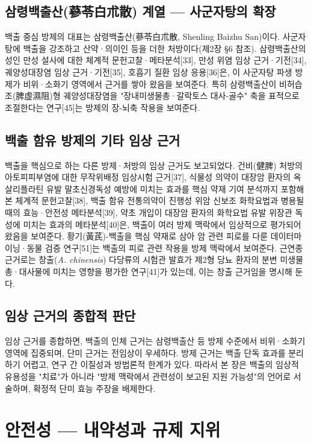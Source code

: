 \documentclass[12pt,oneside]{book}
\begin{document}
\subsection{삼령백출산(蔘苓白朮散) 계열 — 사군자탕의 확장}

백출 중심 방제의 대표는 삼령백출산(蔘苓白朮散, Shenling Baizhu San)이다. 사군자탕에 백출을 강조하고 산약·의이인 등을 더한 처방이다(제2장 §6 참조). 삼령백출산의 성인 만성 설사에 대한 체계적 문헌고찰·메타분석[33], 만성 위염 임상 근거·기전[34], 궤양성대장염 임상 근거·기전[35], 호흡기 질환 임상 응용[36]은, 이 사군자탕 파생 방제가 비위·소화기 영역에서 근거를 쌓아 왔음을 보여준다. 특히 삼령백출산이 비허습조(脾虛濕阻)형 궤양성대장염을 "장내미생물총·갈락토스 대사-골수" 축을 표적으로 조절한다는 연구[45]는 방제의 장-뇌축 작용을 보여준다.

\subsection{백출 함유 방제의 기타 임상 근거}

백출을 핵심으로 하는 다른 방제·처방의 임상 근거도 보고되었다. 건비(健脾) 처방의 아토피피부염에 대한 무작위배정 임상시험 근거[37], 식물성 의약이 대장암 환자의 옥살리플라틴 유발 말초신경독성 예방에 미치는 효과를 핵심 약재 기여 분석까지 포함해 본 체계적 문헌고찰[38], 백출 함유 전통의약이 진행성 위암 신보조 화학요법과 병용될 때의 효능·안전성 메타분석[39], 약초 개입이 대장암 환자의 화학요법 유발 위장관 독성에 미치는 효과의 메타분석[40]은, 백출이 여러 방제 맥락에서 임상적으로 평가되어 왔음을 보여준다. 황기(黃芪)-백출을 핵심 약재로 삼아 암 관련 피로를 다룬 데이터마이닝·동물 검증 연구[51]는 백출의 피로 관련 작용을 방제 맥락에서 보여준다. 근연종 근거로는 창출(\textit{A. chinensis}) 다당류의 시험관 발효가 제2형 당뇨 환자의 분변 미생물총·대사물에 미치는 영향을 평가한 연구[41]가 있는데, 이는 창출 근거임을 명시해 둔다.

\subsection{임상 근거의 종합적 판단}

임상 근거를 종합하면, 백출의 인체 근거는 삼령백출산 등 방제 수준에서 비위·소화기 영역에 집중되며, 단미 근거는 전임상이 우세하다. 방제 근거는 백출 단독 효과를 분리하기 어렵고, 연구 간 이질성과 방법론적 한계가 있다. 따라서 본 장은 백출의 임상적 유용성을 "치료"가 아니라 "방제 맥락에서 관련성이 보고된 지원 가능성"의 언어로 서술하며, 확정적 단미 효능 주장을 배제한다.

\section{안전성 — 내약성과 규제 지위}
\end{document}
